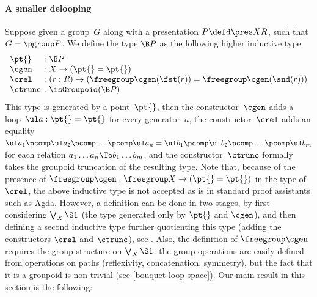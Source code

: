 \paragraph{A smaller delooping}
Suppose given a group~$G$ along with a presentation $P\defd\pres XR$, \ie such that $G=\pgroup P$. We define the type $\B P$ as the following higher inductive type:
\[
  \begin{array}{l@{\ :\ }l}
    \pt{}&{\B P}\\
    \cgen&X\to(\pt{}=\pt{})\\
    \crel&(r:R)\to(\freegroup\cgen(\fst(r))=\freegroup\cgen(\snd(r)))\\
    \ctrunc&\isGroupoid(\B P)
  \end{array}
\]
This type is generated by a point~$\pt{}$, then the constructor~$\cgen$ adds a
loop~$\ul a:\pt{}=\pt{}$ for every generator~$a$, the constructor~$\crel$ adds
an equality
$\ul a_1\pcomp\ul a_2\pcomp\ldots\pcomp\ul a_n=\ul b_1\pcomp\ul
b_2\pcomp\ldots\pcomp\ul b_m$ for each relation
$a_1\ldots a_n\To b_1\ldots b_m$, and the constructor~$\ctrunc$ formally takes
the groupoid truncation of the resulting type. Note that, because of the
presence of $\freegroup\cgen:\freegroup X\to(\pt{}=\pt{})$ in the type
of~$\crel$, the above inductive type is not accepted as is in standard proof
assistants such as Agda. However, a definition can be done in two stages, by
first considering $\bigvee_X\S1$ (\ie the type generated only by $\pt{}$ and $\cgen$), and then defining a
second inductive type further quotienting this type (\ie adding the
constructors $\crel$ and $\ctrunc$), see . Also, the
definition of $\freegroup\cgen$ requires the group structure on $\bigvee_X\S1$: the group operations are easily defined from operations on paths (reflexivity, concatenation, symmetry), but the fact that it is a groupoid is non-trivial (see \cref{bouquet-loop-space}).
%
Our main result in this section is the following:

